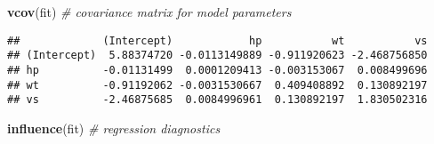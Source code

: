 \documentclass[]{article}
\newenvironment{Shaded}{\begin{snugshade}}{\end{snugshade}}
\newcommand{\CommentTok}[1]{\textcolor[rgb]{0.56,0.35,0.01}{\textit{#1}}}
\newcommand{\KeywordTok}[1]{\textcolor[rgb]{0.13,0.29,0.53}{\textbf{#1}}}
\newcommand{\NormalTok}[1]{#1}
\begin{document}
\begin{Shaded}
\begin{Highlighting}[]
\KeywordTok{vcov}\NormalTok{(fit) }\CommentTok{# covariance matrix for model parameters }
\end{Highlighting}
\end{Shaded}

\begin{verbatim}
##             (Intercept)            hp           wt           vs
## (Intercept)  5.88374720 -0.0113149889 -0.911920623 -2.468756850
## hp          -0.01131499  0.0001209413 -0.003153067  0.008499696
## wt          -0.91192062 -0.0031530667  0.409408892  0.130892197
## vs          -2.46875685  0.0084996961  0.130892197  1.830502316
\end{verbatim}

\begin{Shaded}
\begin{Highlighting}[]
\KeywordTok{influence}\NormalTok{(fit) }\CommentTok{# regression diagnostics}
\end{Highlighting}
\end{Shaded}
\end{document}
